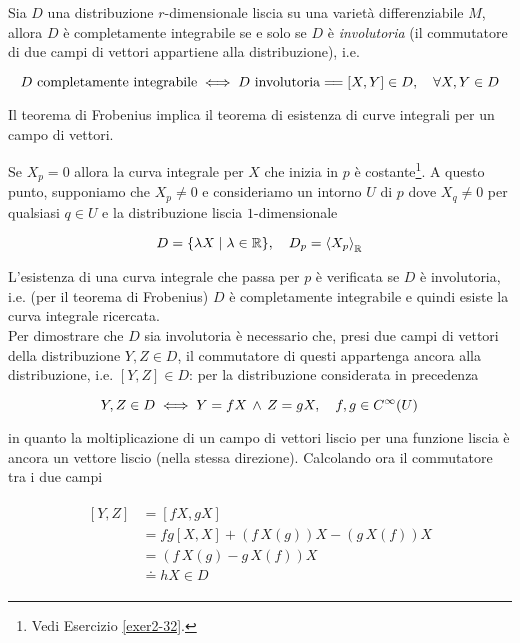 \begin{theorem}[Frobenius]
	Sia $ D $ una distribuzione $ r $-dimensionale liscia su una varietà differenziabile $ M $, allora $ D $ è completamente integrabile se e solo se $ D $ è \textit{involutoria} (il commutatore di due campi di vettori appartiene alla distribuzione), i.e.
	
	\begin{equation}
		D \text{ completamente integrabile} %
		\iff %
		D \text{ involutoria} %
		\stackrel{\quad}{=\joinrel=} %
		[X,Y] \in D \qcomma \forall X,Y \in D
	\end{equation}
\end{theorem}

\begin{remark}
	Il teorema di Frobenius implica il teorema di esistenza di curve integrali per un campo di vettori.
\end{remark}

Se $ X_{p} = 0 $ allora la curva integrale per $ X $ che inizia in $ p $ è costante\footnote{%
	Vedi Esercizio \ref{exer2-32}.%
}. A questo punto, supponiamo che $ X_{p} \neq 0 $ e consideriamo un intorno $ U $ di $ p $ dove $ X_{q} \neq 0 $ per qualsiasi $ q \in U $ e la distribuzione liscia $ 1 $-dimensionale

\begin{equation}
	D = \{ \lambda X \mid \lambda \in \R \} \qcomma D_{p} = \ev{ X_{p} }_{\R}
\end{equation}

L'esistenza di una curva integrale che passa per $ p $ è verificata se $ D $ è involutoria, i.e. (per il teorema di Frobenius) $ D $ è completamente integrabile e quindi esiste la curva integrale ricercata. \\
Per dimostrare che $ D $ sia involutoria è necessario che, presi due campi di vettori della distribuzione $ Y,Z \in D $, il commutatore di questi appartenga ancora alla distribuzione, i.e. $ [Y,Z] \in D $: per la distribuzione considerata in precedenza

\begin{equation}
	Y,Z \in D \iff Y = f X \, \wedge \, Z = g X \qcomma f,g \in C^{\infty}(U)
\end{equation}

in quanto la moltiplicazione di un campo di vettori liscio per una funzione liscia è ancora un vettore liscio (nella stessa direzione). Calcolando ora il commutatore tra i due campi

\begin{align}
	\begin{split}
		[Y,Z] &= [fX,gX] \\
		&= fg [X,X] + (f \, X(g)) X - (g \, X(f)) X \\
		&= (f \, X(g) - g \, X(f)) X \\
		&\doteq h X \in D
	\end{split}
\end{align}

